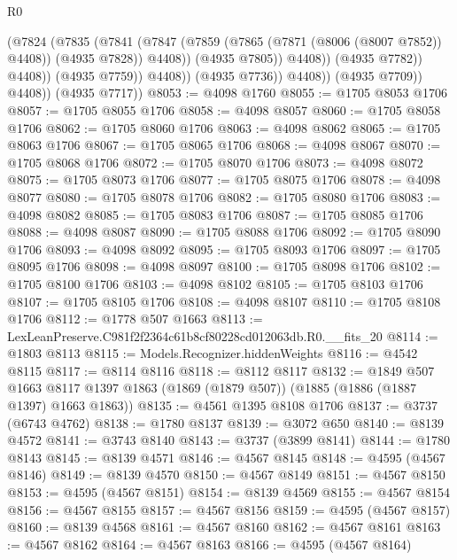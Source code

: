\begin{lexlean}{R0}
\begin{coremodule}
                                (@7824
                                  (@7835
                                    (@7841
                                      (@7847
                                        (@7859
                                          (@7865 (@7871 (@8006 (@8007 @7852)) @4408))
                                          (@4935 @7828))
                                        @4408))
                                    (@4935 @7805))
                                  @4408))
                              (@4935 @7782))
                            @4408))
                        (@4935 @7759))
                      @4408))
                  (@4935 @7736))
                @4408))
            (@4935 @7709))
          @4408))
      (@4935 @7717))
@8053 := @4098 @1760
@8055 := @1705 @8053 @1706
@8057 := @1705 @8055 @1706
@8058 := @4098 @8057
@8060 := @1705 @8058 @1706
@8062 := @1705 @8060 @1706
@8063 := @4098 @8062
@8065 := @1705 @8063 @1706
@8067 := @1705 @8065 @1706
@8068 := @4098 @8067
@8070 := @1705 @8068 @1706
@8072 := @1705 @8070 @1706
@8073 := @4098 @8072
@8075 := @1705 @8073 @1706
@8077 := @1705 @8075 @1706
@8078 := @4098 @8077
@8080 := @1705 @8078 @1706
@8082 := @1705 @8080 @1706
@8083 := @4098 @8082
@8085 := @1705 @8083 @1706
@8087 := @1705 @8085 @1706
@8088 := @4098 @8087
@8090 := @1705 @8088 @1706
@8092 := @1705 @8090 @1706
@8093 := @4098 @8092
@8095 := @1705 @8093 @1706
@8097 := @1705 @8095 @1706
@8098 := @4098 @8097
@8100 := @1705 @8098 @1706
@8102 := @1705 @8100 @1706
@8103 := @4098 @8102
@8105 := @1705 @8103 @1706
@8107 := @1705 @8105 @1706
@8108 := @4098 @8107
@8110 := @1705 @8108 @1706
@8112 := @1778 @507 @1663
@8113 := LexLeanPreserve.C981f2f2364c61b8cf80228cd012063db.R0.__fits_20
@8114 := @1803 @8113
@8115 := Models.Recognizer.hiddenWeights
@8116 := @4542 @8115
@8117 := @8114 @8116
@8118 := @8112 @8117
@8132 := @1849
    @507
    @1663
    @8117
    @1397
    @1863
    (@1869 (@1879 @507))
    (@1885 (@1886 (@1887 @1397) @1663 @1863))
@8135 := @4561 @1395 @8108 @1706
@8137 := @3737 (@6743 @4762)
@8138 := @1780 @8137
@8139 := @3072 @650
@8140 := @8139 @4572
@8141 := @3743 @8140
@8143 := @3737 (@3899 @8141)
@8144 := @1780 @8143
@8145 := @8139 @4571
@8146 := @4567 @8145
@8148 := @4595 (@4567 @8146)
@8149 := @8139 @4570
@8150 := @4567 @8149
@8151 := @4567 @8150
@8153 := @4595 (@4567 @8151)
@8154 := @8139 @4569
@8155 := @4567 @8154
@8156 := @4567 @8155
@8157 := @4567 @8156
@8159 := @4595 (@4567 @8157)
@8160 := @8139 @4568
@8161 := @4567 @8160
@8162 := @4567 @8161
@8163 := @4567 @8162
@8164 := @4567 @8163
@8166 := @4595 (@4567 @8164)

\end{coremodule}
\end{lexlean}
